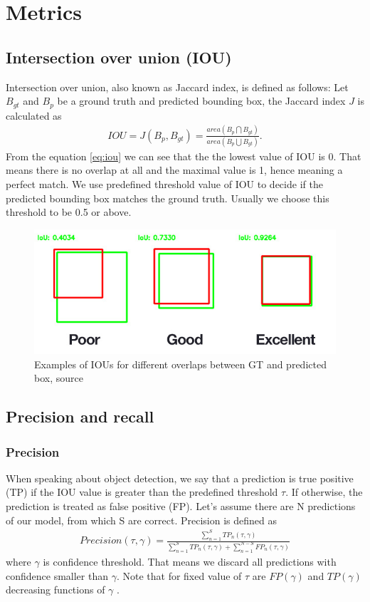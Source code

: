 \section{Metrics}
\subsection{Intersection over union (IOU) }
Intersection over union, also known as Jaccard index, is defined as follows: Let $B_{gt}$ and $B_p$ be a ground truth and predicted bounding box, the Jaccard index $J$ is calculated as
\begin{align}
    IOU = J(B_p, B_{gt}) = \frac{area(B_p \bigcap B_{gt})}{area(B_p \bigcup B_{gt})}.
    \label{eq:iou}
\end{align}
From the equation \ref{eq:iou} we can see that the the lowest value of IOU is 0. That means there is no overlap at all and the maximal value is 1, hence meaning a perfect match.
We use predefined threshold value of IOU to decide if the predicted bounding box matches the ground truth. Usually we choose this threshold to be 0.5 or above.

\begin{figure}
    \includegraphics[width = \linewidth]{images/IOU.jpg}
    \caption{Examples of IOUs for different overlaps between GT and predicted box, source \cite{Cowton2019}}
    \label{fig:iou}
\end{figure}

\subsection{Precision and recall}
\subsubsection{Precision}
\label{subsec:precision}
When speaking about object detection, we say that a prediction is true positive (TP) if the IOU value is greater than the predefined threshold $\tau$. If otherwise, the prediction is treated as false positive (FP). Let's assume there are N predictions of our model, from which S are correct. Precision is defined as
\begin{align}
    Precision(\tau, \gamma) = \frac{\sum_{n=1}^S TP_n(\tau, \gamma)}{\sum_{n=1}^S TP_n(\tau, \gamma) + \sum_{n=1}^{N-S} FP_n(\tau, \gamma)}
\end{align}
where $\gamma$ is confidence threshold. That means we discard all predictions with confidence smaller than $\gamma$. Note that for fixed value of $\tau$ are $FP(\gamma)$ and $TP(\gamma)$ decreasing functions of $\gamma$ \cite{Padilla2021}.

